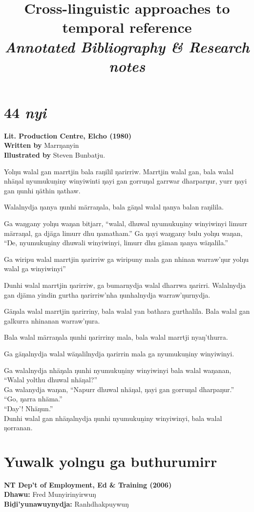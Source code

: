 \documentclass[10pt]{article}
\title{Cross-linguistic approaches to temporal reference\\\small\em Annotated Bibliography \& Research notes}
\date{}
\begin{document}
	
\section*{44 \textit{nyi}}
\textbf{Lit. Production Centre, Elcho (1980)}\\
\textbf{Written by} Marrŋanyin\\
\textbf{Illustrated by }Steven Bunbatju.

	
	
Yolŋu walal gan marrtjin bala raŋilil ŋarirriw. Marrtjin walal gan, bala walal nhäŋal nyumukuṉiny winyiwinti ŋayi gan gorruŋal garrwar dharparŋur, yurr ŋayi gan ŋunhi ŋäthin ŋathaw.

Walalnydja ŋanya ŋunhi märraŋala, bala gäŋal walal ŋanya balan raŋilila.

Ga waŋgany yolŋu waŋan bitjarr, ``walal, dhuwal nyumukuṉiny winyiwinyi limurr märraŋal, ga djäga limurr dhu ŋamatham.'' Ga ŋayi waŋgany bulu yolŋu waŋan, ``Ŋe, nyumukuṉiny dhuwali winyiwinyi, limurr dhu gäman ŋanya wäŋalila.''

Ga wiripu walal marrtjin ŋarirriw ga wiripuny mala gan nhinan warraw'ŋur yolŋu walal ga winyiwinyi''

Ŋunhi walal marrtjin ŋarirriw, ga bumarnydja walal dharrwa ŋarirri. Walalnydja gan djäma yindin gurtha ŋarirriw'nha ŋunhalnydja warraw'ŋurnydja.

Gäŋala walal marrtjin ŋarirriny, bala walal yan bathara gurthalila. Bala walal gan galkurra nhinanan warraw'ŋura.

Bala walal märraŋala ŋunhi ŋarirriny mala, bala walal marrtji nyaŋ'thurra.

Ga gäŋalnydja walal wäŋalilnydja ŋarirrin mala ga nyumukuṉiny winyiwinyi.

Ga walalnydja nhäŋala ŋunhi nyumukuṉiny winyiwinyi bala walal waŋanan, ``Walal yolthu dhuwal nhäŋal?''\\Ga walanydja waŋan, ``Napurr dhuwal nhäŋal, ŋayi gan gorruŋal dharpaŋur.''\\
``Go, ŋarra nhäma.''\\
``Ŋay'! Nhäŋun.''\\
Ŋunhi walal gan nhäŋalnydja ŋunhi nyumukuṉiny winyiwinyi, bala walal ŋorranan.

\section*{Yuwalk yolngu ga buthurumirr}
\textbf{NT Dep't of Employment, Ed \& Training (2006)}\\
\textbf{Dhawu: } Fred Munyirinyirwuŋ\\
\textbf{Biḏi'yunawuynydja:} Ranhdhakpuywuŋ
\end{document}

